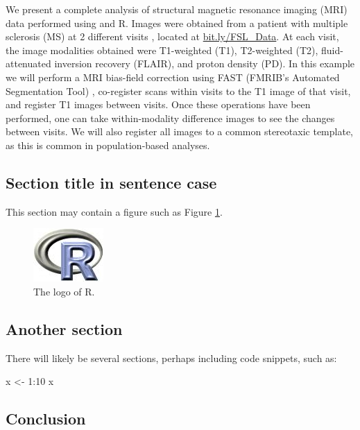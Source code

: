 We present a complete analysis of structural magnetic resonance imaging
(MRI) data performed using  and R. Images were obtained from a
patient with multiple sclerosis (MS) at 2 different visits
\citep{sweeney_automatic_2013}, located at \url{bit.ly/FSL_Data}. At
each visit, the image modalities obtained were T1-weighted (T1),
T2-weighted (T2), fluid-attenuated inversion recovery (FLAIR), and
proton density (PD). In this example we will perform a MRI bias-field
correction using FAST (FMRIB's Automated Segmentation Tool)
\citep{zhang_segmentation_2001}, co-register scans within visits to the
T1 image of that visit, and register T1 images between visits. Once
these operations have been performed, one can take within-modality
difference images to see the changes between visits. We will also
register all images to a common stereotaxic template, as this is common
in population-based analyses.

\subsection{Section title in sentence
case}\label{section-title-in-sentence-case}

This section may contain a figure such as Figure \ref{figure:rlogo}.

\begin{figure}[htbp]
  \centering
  \includegraphics{Rlogo}
  \caption{The logo of R.}
  \label{figure:rlogo}
\end{figure}

\subsection{Another section}\label{another-section}

There will likely be several sections, perhaps including code snippets,
such as:

\begin{Schunk}
\begin{Sinput}
x <- 1:10
x
\end{Sinput}
\end{Schunk}

\subsection{Conclusion}\label{conclusion}

